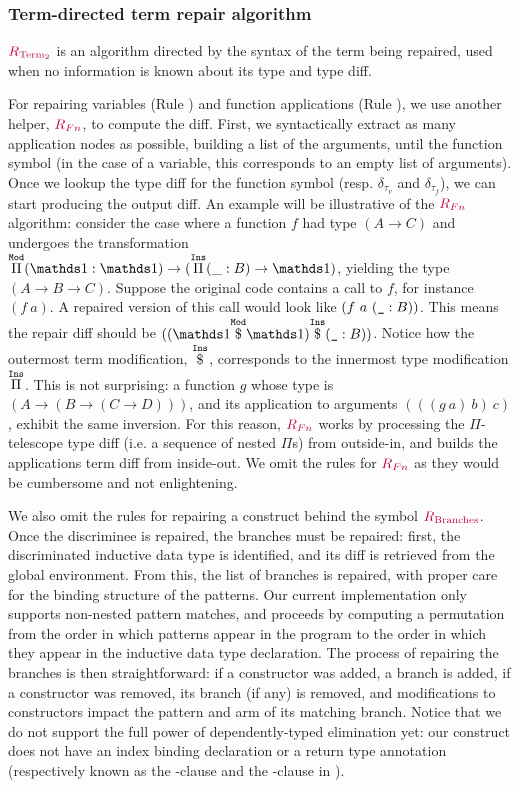 \subsubsection*{Term-directed term repair algorithm}

$\textcolor{purple}{R_{\text{Term}_2}}$ is an algorithm directed by the syntax of the term being
repaired, used when no information is known about its type and type diff.

For repairing variables (Rule ) and function applications
(Rule ), we use another helper, $\textcolor{purple}{R_{Fn}}$, to compute
the diff.  First, we syntactically extract as many application nodes as
possible, building a list of the arguments, until the function symbol (in the
case of a variable, this corresponds to an empty list of arguments).  Once we
lookup the type diff for the function symbol (resp. $\delta_{\tau_v}$ and
$\delta_{\tau_f}$), we can start producing the output diff.  An example will be
illustrative of the $\textcolor{purple}{R_{Fn}}$ algorithm: consider the case where a
function $f$ had type $(A \rightarrow C)$ and undergoes the transformation
$\MathModPi{\MathSame}{\MathSame}{(\MathInsPi{B}{\_}{\MathSame})}$, yielding the
type $(A \rightarrow B \rightarrow C)$.  Suppose the original code contains a
call to $f$, for instance $(f\ a)$.  A repaired version of this call would look
like $(f\ a\ (\texttt{\_} : B))$.  This means the repair diff should be
$(\MathInsApp{(\MathModApp{\MathSame}{\MathSame})}{(\MathAnnot{\MathHole}{B})})$.
Notice how the outermost term modification, $\overset{\mathtt{Ins}}{\$}$, corresponds to the
innermost type modification $\overset{\mathtt{Ins}}{\Pi}$.  This is not surprising: a function
$g$ whose type is $(A \rightarrow (B \rightarrow (C \rightarrow D)))$, and its
application to arguments $(((g\ a)\ b)\ c)$, exhibit the same inversion.  For
this reason, $\textcolor{purple}{R_{Fn}}$ works by processing the $\Pi$-telescope type diff
(i.e. a sequence of nested $\Pi$s) from outside-in, and builds the applications
term diff from inside-out.  We omit the rules for $\textcolor{purple}{R_{Fn}}$ as they would
be cumbersome and not enlightening.

We also omit the rules for repairing a  construct behind the
symbol $\textcolor{purple}{R_{\text{Branches}}}$.  Once the discriminee is repaired, the branches must
be repaired: first, the discriminated inductive data type is identified, and its
diff is retrieved from the global environment.  From this, the list of branches
is repaired, with proper care for the binding structure of the patterns.  Our
current implementation only supports non-nested pattern matches, and proceeds by
computing a permutation from the order in which patterns appear in the program
to the order in which they appear in the inductive data type declaration.  The
process of repairing the branches is then straightforward: if a constructor was
added, a branch is added, if a constructor was removed, its branch (if any) is
removed, and modifications to constructors impact the pattern and arm of its
matching branch.  Notice that we do not support the full power of
dependently-typed elimination yet: our  construct does not have
an index binding declaration or a return type annotation (respectively known as
the -clause and the -clause in \Gallina{}).

